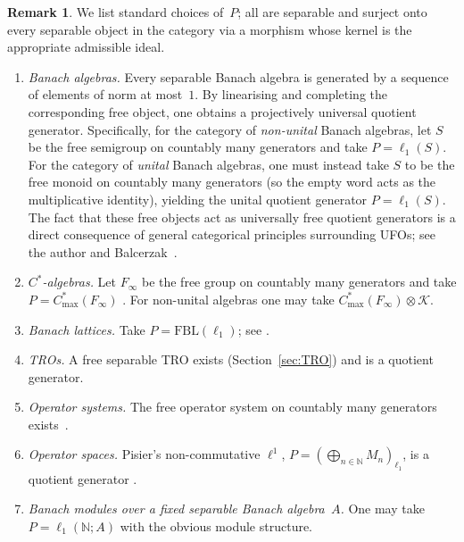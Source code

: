 \documentclass[12pt,fleqn,a4paper]{amsart}
\numberwithin{equation}{section}
\theoremstyle{definition}
\newtheorem{remark}[theorem]{Remark}
\newcommand{\N}{\mathbb{N}}
\begin{document}
\begin{remark}\label{rem:proj-gens}
We list standard choices of~$P$; all are separable and surject onto every separable
object in the category via a morphism whose kernel is the appropriate admissible ideal.

\begin{enumerate}[label=(\alph*), itemsep=.4em]
\item \emph{Banach algebras.}
Every separable Banach algebra is generated by a sequence of elements of norm at
most~$1$.  By linearising and completing the corresponding free object, one obtains a
projectively universal quotient generator.  Specifically, for the category of
\emph{non-unital} Banach algebras, let $S$ be the free semigroup on countably many
generators and take $P=\ell_1(S)$.  For the category of \emph{unital} Banach algebras,
one must instead take $S$ to be the free monoid on countably many generators (so the
empty word acts as the multiplicative identity), yielding the unital quotient generator
$P=\ell_1(S)$.  The fact that these free objects act as universally free quotient
generators is a direct consequence of general categorical principles surrounding UFOs;
see the author and Balcerzak~\cite{BalcerzakKania2023}.

\item \emph{$C^*$-algebras.}
Let $F_\infty$ be the free group on countably many generators and take
$P=C^*_{\max}(F_\infty)$ \cite[{\S}V.2.1]{Blackadar}.
For non-unital algebras one may take $C^*_{\max}(F_\infty)\otimes\mathcal K$.

\item \emph{Banach lattices.}
Take $P=\mathrm{FBL}(\ell_1)$; see \cite{FreeBLl1}.

\item \emph{TROs.}
A free separable TRO exists (Section~\ref{sec:TRO}) and is a quotient generator.

\item \emph{Operator systems.}
The free operator system on countably many generators exists~\cite{KPTT}.

\item \emph{Operator spaces.}
Pisier's non-commutative $\ell^1$,
$P=(\bigoplus_{n\in\N} M_n)_{\ell_1}$, is a quotient generator
\cite{EffrosRuanBook,PisierOS}.

\item \emph{Banach modules over a fixed separable Banach algebra~$A$.}
One may take $P=\ell_1(\N;A)$ with the obvious module structure.
\end{enumerate}
\end{remark}
\end{document}

